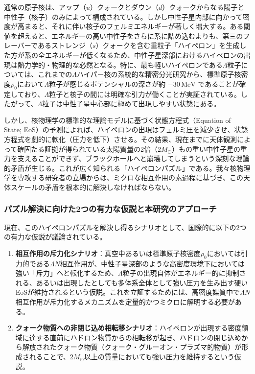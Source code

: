 \documentclass[11pt,a4j,dvipdfmx]{jarticle} 					%
\newcommand{\研究課題名}{加速器実験による短距離バリオン間相互作用の解明と中性子星ハイペロンパズルの解決}
\newcommand{\研究機関名}{東北大学}
\newcommand{\研究代表者氏名}{市川裕大}
\newcommand{\研究期間の最終元号年度}{13}  %
\begin{document}
通常の原子核は、アップ（$u$）クォークとダウン（$d$）クォークからなる陽子と中性子（核子）のみによって構成されている。しかし中性子星内部に向かって密度が高まると、それに伴い核子のフェルミエネルギーが著しく増大する。ある閾値を超えると、エネルギーの高い中性子をさらに系に詰め込むよりも、第三のフレーバーであるストレンジ（$s$）クォークを含む重粒子「ハイペロン」を生成した方が系の全エネルギーが低くなるため、中性子星深部におけるハイペロンの出現は熱力学的・物理的な必然となる。特に、最も軽いハイペロンである$\Lambda$粒子については、これまでの$\Lambda$ハイパー核の系統的な精密分光研究から、標準原子核密度$\rho_0$において$\Lambda$粒子が感じるポテンシャルの深さが約 $-30\,\text{MeV}$ であることが確定しており、$\Lambda$粒子と核子の間には明確な引力が働くことが実証されている。したがって、$\Lambda$粒子は中性子星中心部に極めて出現しやすい状態にある。

しかし、核物理学の標準的な理論モデルに基づく状態方程式（Equation of State; EoS）の予測によれば、ハイペロンの出現はフェルミ圧を減少させ、状態方程式を劇的に軟化（圧力を低下）させる。その結果、現在までに天体観測によって確固たる証拠が得られている太陽質量の2倍（$2M_\odot$）もの重い中性子星の重力を支えることができず、ブラックホールへと崩壊してしまうという深刻な理論的矛盾が生じる。これが広く知られる「ハイペロンパズル」である。我々核物理学を専攻する研究者の立場からは、ミクロな相互作用の素過程に基づき、この天体スケールの矛盾を根本的に解決しなければならない。

\subsubsection{パズル解決に向けた2つの有力な仮説と本研究のアプローチ}
現在、このハイペロンパズルを解決し得るシナリオとして、国際的に以下の2つの有力な仮説が議論されている。
\begin{enumerate}
    \item \textbf{相互作用の斥力化シナリオ}：真空中あるいは標準原子核密度$\rho_0$においては引力的である$\Lambda N$相互作用が、中性子星深部のような高密度環境下においては強い「斥力」へと転化するため、$\Lambda$粒子の出現自体がエネルギー的に抑制される、あるいは出現したとしても多体系全体として強い圧力を生み出す硬いEoSが維持されるという仮説。これを立証するためには、高密度媒質中で$\Lambda N$相互作用が斥力化するメカニズムを定量的かつミクロに解明する必要がある。
    \item \textbf{クォーク物質への非閉じ込め相転移シナリオ}：ハイペロンが出現する密度領域に達する直前にハドロン物質からの相転移が起き、ハドロンの閉じ込めから解放されたクォーク物質（クォーク・グルーオン・プラズマ的物質）が形成されることで、$2M_\odot$以上の質量においても強い圧力を維持するという仮説。
\end{enumerate}
\end{document}

